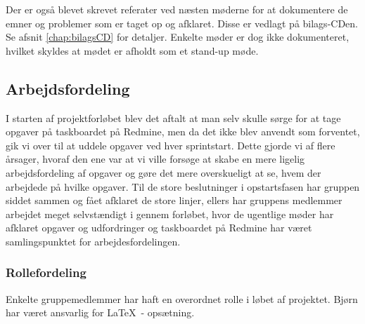 Der er også blevet skrevet referater ved næsten møderne for at dokumentere de emner og problemer som er taget op og afklaret. Disse er vedlagt på bilags-CDen. Se afsnit \ref{chap:bilagsCD} for detaljer. Enkelte møder er dog ikke dokumenteret, hvilket skyldes at mødet er afholdt som et stand-up møde.

\subsection{Arbejdsfordeling}
I starten af projektforløbet blev det aftalt at man selv skulle sørge for at tage opgaver på taskboardet på Redmine, men da det ikke blev anvendt som forventet, gik vi over til at uddele opgaver ved hver sprintstart. Dette gjorde vi af flere årsager, hvoraf den ene var at vi ville forsøge at skabe en mere ligelig arbejdsfordeling af opgaver og gøre det mere overskueligt at se, hvem der arbejdede på hvilke opgaver. Til de store beslutninger i opstartsfasen har gruppen siddet sammen og fået afklaret de store linjer, ellers har gruppens medlemmer arbejdet meget selvstændigt i gennem forløbet, hvor de ugentlige møder har afklaret opgaver og udfordringer og taskboardet på Redmine har været samlingspunktet for arbejdesfordelingen.

\subsubsection{Rollefordeling}
Enkelte gruppemedlemmer har haft en overordnet rolle i løbet af projektet. Bjørn har været ansvarlig for \LaTeX\ - opsætning.
